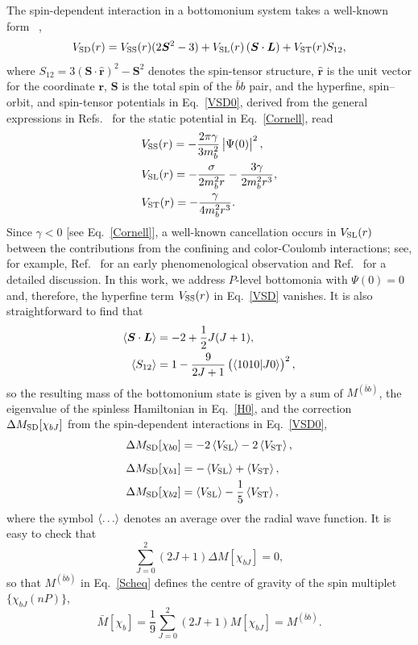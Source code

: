 \documentclass[aps,prd,showpacs,amsmath,twocolumn,superscriptaddress,floatfix,nofootinbib,notitlepage]{revtex4-2}
\newcommand{\Mbb}{M^{(\bar{b}b)}}
\newcommand{\ver}{{\bm r}}
\newcommand{\be}{\begin{equation}}
\newcommand{\ee}{\end{equation}}
\newcommand{\veL}{{\bm L}}
\newcommand{\veS}{{\bm S}}
\begin{document}
The spin-dependent interaction in a bottomonium system takes a well-known form ~\cite{Eichten:1980mw,Gromes:1984ma},
\be
\begin{split}
V_{\rm SD}(r)=V_{\rm SS}(r)(2\veS^2-3)+V_{\rm SL}(r)\left(\veS\cdot\veL\right)
+V_{\rm ST}(r)S_{12},
\label{VSD0}
\end{split}
\ee
where $S_{12}=3(\veS\cdot\hat \ver)^2-\veS^2$ denotes the spin-tensor structure, $\hat \ver$ is the unit vector for the coordinate $\ver$, $\veS$ is the total spin of the $\bar{b}b$ pair, and the hyperfine, spin--orbit, and spin-tensor potentials in Eq.~\eqref{VSD0}, derived from the general expressions in Refs.~\cite{Eichten:1980mw,Gromes:1984ma} for the static potential in Eq.~\eqref{Cornell}, read
\be
\begin{split}
&V_{\rm SS}(r)=-\frac{2\pi\gamma}{3m_b^2}\left|\Psi(0)\right|^2,\\
&V_{\rm SL}(r)=-\frac{\sigma}{2m_b^2r}-\frac{3\gamma}{2m_b^2r^3},\\
&V_{\rm ST}(r)=-\frac{\gamma}{4m_b^2r^3}.
\end{split}
\label{VSD}
\ee
Since $\gamma<0$ [see Eq.~\eqref{Cornell}], a well-known cancellation occurs in $V_{\rm SL}(r)$ between the contributions from the confining and color-Coulomb interactions; see, for example, Ref.~\cite{Schnitzer:1983tt} for an early phenomenological observation and Ref.~\cite{Isgur:1999rf} for a detailed discussion. In this work, we address $P$-level bottomonia with $\Psi(0)=0$ and, therefore, the hyperfine term $V_{\rm SS}(r)$ in Eq.~\eqref{VSD} vanishes. It is also straightforward to find that
\be
\begin{split}
\braket{\veS\cdot\veL} &=-2+\frac12J(J+1),\\
\braket{S_{12}} &=1-\frac{9}{2J+1}\left(\braket{1010|J0}\right)^2,
\end{split}
\ee
so the resulting mass of the bottomonium state is given by a sum of $\Mbb$, the eigenvalue of the spinless Hamiltonian in Eq.~\eqref{H0}, and the correction $\Delta M_{\rm SD}[\chi_{bJ}]$ from the spin-dependent interactions in Eq.~\eqref{VSD0},
\be
\begin{split}
\Delta M_{\rm SD}[\chi_{b0}] &= -2\braket{V_{\rm SL}} - 2\braket{V_{\rm ST}}, \\[2mm]
\Delta M_{\rm SD}[\chi_{b1}] &= -\braket{V_{\rm SL}} + \braket{V_{\rm ST}}, \\
\Delta M_{\rm SD}[\chi_{b2}] &= \braket{V_{\rm SL}} - \frac15\braket{V_{\rm ST}},
\end{split}
\label{DeltaEn}
\ee
where the symbol $\braket{\ldots}$ denotes an average over the radial wave function. It is easy to check that 
\be
\sum_{J=0}^2(2J+1)\Delta M[\chi_{bJ}]=0,
\label{chis2}
\ee
so that $\Mbb$ in Eq.~\eqref{Scheq} defines the centre of gravity of the spin multiplet $\{\chi_{bJ}(nP)\}$,
\be
\bar{M}[\chi_b]=\frac{1}{9}
\sum_{J=0}^2(2J+1)M[\chi_{bJ}]=\Mbb.
\label{chis}
\ee 
\end{document}
